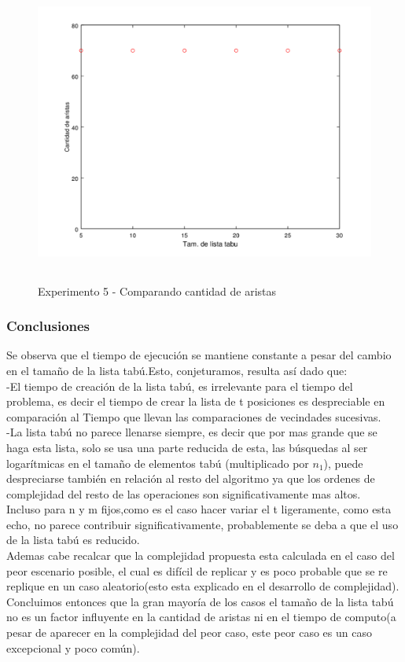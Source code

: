  \begin{figure}[H]
      \includegraphics[height=10cm]{graficos/ejercicio6-exp5-aristas.png}
       \caption{Experimento 5 - Comparando cantidad de aristas}
	\end{figure}


\subsubsection*{Conclusiones}\;
Se observa que el tiempo de ejecución se mantiene constante a pesar del cambio en el tamaño de la lista tabú.Esto, conjeturamos, resulta así dado que:\\
-El tiempo de creación de la lista tabú, es irrelevante para el tiempo del problema, es decir el tiempo de crear la lista de t posiciones es despreciable en comparación al Tiempo que llevan las comparaciones de vecindades sucesivas.\\
-La lista tabú no parece llenarse siempre, es decir que por mas grande que se haga esta lista, solo se usa una parte reducida de esta, las búsquedas al ser logarítmicas en el tamaño de elementos tabú (multiplicado por $n_1$), puede despreciarse también en relación al resto del algoritmo ya que los ordenes de complejidad del resto de las operaciones son significativamente mas altos.\\ Incluso para n y m fijos,como es el caso hacer variar el t ligeramente, como esta echo, no parece contribuir significativamente, probablemente se deba a que el uso de la lista tabú es reducido.\\
Ademas cabe recalcar que la complejidad propuesta esta calculada en el caso del peor escenario posible, el cual es difícil de replicar y es poco probable que se re replique en un caso aleatorio(esto esta explicado en el desarrollo de complejidad).\\
Concluimos entonces que la gran mayoría de los casos el tamaño de la lista tabú no es un factor influyente en la cantidad de aristas ni en el tiempo de computo(a pesar de aparecer en la complejidad del peor caso, este peor caso es un caso excepcional y poco común).
 
